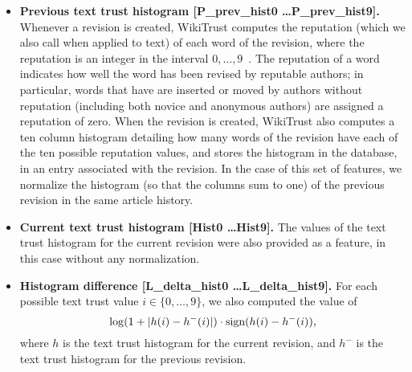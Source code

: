 \begin{itemize}
\item \textbf{Previous text trust histogram [P\_prev\_hist0 \ldots P\_prev\_hist9].}
Whenever a revision is created, WikiTrust computes the reputation (which
we also call  when applied to text) of each word of the
revision, where the reputation is an
integer in the interval $0, \ldots, 9$~\cite{Adler2008b}.  The
reputation of a word indicates how well the word has been revised by
reputable authors; in particular, words that have are inserted or
moved by authors without reputation (including both novice and
anonymous authors) are assigned a reputation of zero.  When the revision is
created, WikiTrust also computes a ten column histogram detailing how
many words of the revision have each of the ten possible reputation
values, and stores the histogram in the database, in an entry associated
with the revision.
In the case of this set of features, we normalize the histogram (so that
the columns sum to one) of the previous revision in the same article history.

\item \textbf{Current text trust histogram [Hist0 \ldots Hist9].}
The values of the text trust histogram for the current revision were also
provided as a feature, in this case without any normalization.

\item \textbf{Histogram difference [L\_delta\_hist0 \ldots L\_delta\_hist9].}
For each possible text trust value $i \in \{0, \ldots, 9\}$, we also
computed the value of
\begin{equation}
\log(1 + |h(i) - h^{-}(i)|) \cdot {{\textrm{sign}}}(h(i) -
h^{-}(i)),
\end{equation}
where $h$ is the text trust histogram for the current
revision, and $h^{-}$ is the text trust histogram for the previous
revision.

\end{itemize}
%

